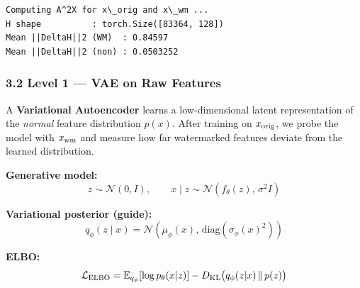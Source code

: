 \documentclass[11pt]{article}
\begin{document}
    \begin{Verbatim}[commandchars=\\\{\}]
Computing A^2X for x\_orig and x\_wm ...
H shape          : torch.Size([83364, 128])
Mean ||DeltaH||2 (WM)  : 0.84597
Mean ||DeltaH||2 (non) : 0.0503252
    \end{Verbatim}

    \subsubsection{3.2 Level 1 --- VAE on Raw
Features}\label{level-1-vae-on-raw-features}

A \textbf{Variational Autoencoder} learns a low-dimensional latent
representation of the \emph{normal} feature distribution \(p(x)\). After
training on \(x_{\rm orig}\), we probe the model with \(x_{\rm wm}\) and
measure how far watermarked features deviate from the learned
distribution.

\textbf{Generative model:} \[
z \sim \mathcal{N}(0, I), \qquad
x \mid z \sim \mathcal{N}(f_\theta(z),\, \sigma^2 I)
\]

\textbf{Variational posterior (guide):} \[
q_\phi(z \mid x) = \mathcal{N}\!\left(\mu_\phi(x),\, \mathrm{diag}(\sigma_\phi(x)^2)\right)
\]

\textbf{ELBO:} \[
\mathcal{L}_{\rm ELBO} = \mathbb{E}_{q_\phi}[\log p_\theta(x|z)]
- D_{\rm KL}\bigl(q_\phi(z|x)\,\|\,p(z)\bigr)
\]
\end{document}
